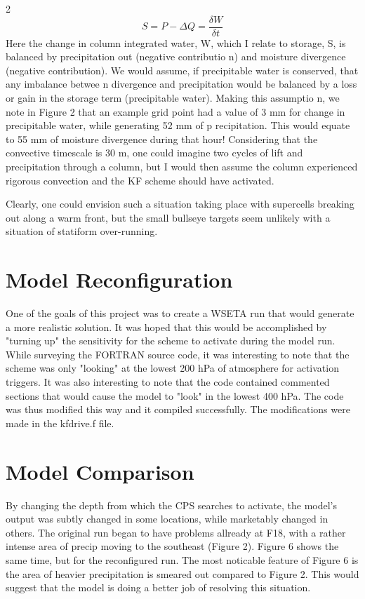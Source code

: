 \documentclass{article}
\begin{document}
\begin{multicols}{2}
\begin{equation}
 S = P - \Delta Q = \frac{\delta W}{\delta t}
 \label{Simple Water Conservation}
\end{equation}
Here the change in column integrated water, W, which I relate to storage, S, is balanced by precipitation out (negative contributio
n) and moisture divergence (negative contribution).  We would assume, if precipitable water is conserved, that any imbalance betwee
n divergence and precipitation would be balanced by a loss or gain in the storage term (precipitable water).  Making this assumptio
n, we note in Figure 2 that an example grid point had a value of 3 mm for change in precipitable water, while generating 52 mm of p
recipitation.  This would equate to 55 mm of moisture divergence during that hour! Considering that the convective timescale is 30
m, one could imagine two cycles of lift and precipitation through a column, but I would then assume the column experienced rigorous
 convection and the KF scheme should have activated.


Clearly, one could envision such a situation taking place with supercells breaking out along a warm front, but the small bullseye targets seem unlikely with a situation of statiform over-running.


\section{Model Reconfiguration}
One of the goals of this project was to create a WSETA run that would generate a more realistic solution.  It was hoped that this would be accomplished by "turning up" the sensitivity for the scheme to activate during the model run.  While surveying the FORTRAN source code, it was interesting to note that the scheme was only "looking" at the lowest 200 hPa of atmosphere for activation triggers.  It was also interesting to note that the code contained commented sections that would cause the model to "look" in the lowest 400 hPa.  The code was thus modified this way and it compiled successfully.  The modifications were made in the kfdrive.f file.

\section{Model Comparison}
By changing the depth from which the CPS searches to activate, the model's output was subtly changed in some locations, while marketably changed in others.  The original run began to have problems allready at F18, with a rather intense area of precip moving to the southeast (Figure 2).  Figure 6 shows the same time, but for the reconfigured run.  The most noticable feature of Figure 6 is the area of heavier precipitation is smeared out compared to Figure 2.  This would suggest that the model is doing a better job of resolving this situation.


\end{multicols}
\end{document}
